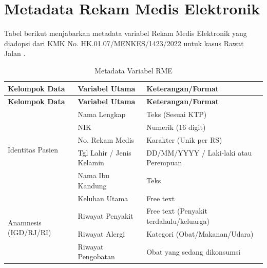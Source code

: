 \chapter{Metadata Rekam Medis Elektronik}
\label{lampiran:metadata-rme}

Tabel berikut menjabarkan metadata variabel Rekam Medis Elektronik yang diadopsi dari KMK No. HK.01.07/MENKES/1423/2022 untuk kasus Rawat Jalan \autocite{kemenkes1423-2022}.

\begin{longtable}{|p{4cm}|p{5cm}|p{5cm}|}
	\caption{Metadata Variabel RME} \label{tab:metadata-rme}                                                         \\
	\hline
	\textbf{Kelompok Data} & \textbf{Variabel Utama}   & \textbf{Keterangan/Format}                                  \\ \hline
	\endfirsthead
	\hline
	\textbf{Kelompok Data} & \textbf{Variabel Utama}   & \textbf{Keterangan/Format}                                  \\ \hline
	\endhead

	\multirow{5}{4cm}{Identitas Pasien}
	                       & Nama Lengkap              & Teks (Sesuai KTP)                                           \\ \cline{2-3}
	                       & NIK                       & Numerik (16 digit)                                          \\ \cline{2-3}
	                       & No. Rekam Medis           & Karakter (Unik per RS)                                      \\ \cline{2-3}
	                       & Tgl Lahir / Jenis Kelamin & DD/MM/YYYY / Laki-laki atau Perempuan                       \\ \cline{2-3}
	                       & Nama Ibu Kandung          & Teks                                                        \\ \hline

	\multirow{4}{4cm}{Anamnesis (IGD/RJ/RI)}
	                       & Keluhan Utama             & Free text                                                   \\ \cline{2-3}
	                       & Riwayat Penyakit          & Free text (Penyakit terdahulu/keluarga)                     \\ \cline{2-3}
	                       & Riwayat Alergi            & Kategori (Obat/Makanan/Udara)                               \\ \cline{2-3}
	                       & Riwayat Pengobatan        & Obat yang sedang dikonsumsi                                 \\ \hline


\end{longtable}
